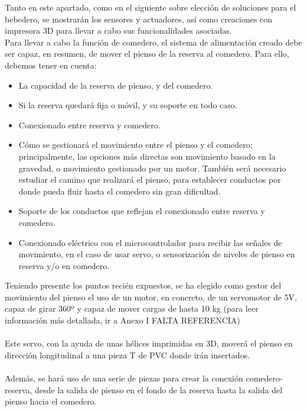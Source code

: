 \documentclass[12pt]{article}
\begin{document}
	\noindent Tanto en este apartado, como en el siguiente sobre elección de soluciones para el bebedero, se mostrarán los sensores y actuadores, así como creaciones con impresora 3D para llevar a cabo sus funcionalidades asociadas.\\
	
	\noindent Para llevar a cabo la función de comedero, el sistema de alimentación creado debe ser capaz, en resumen, de mover el pienso de la reserva al comedero. Para ello, debemos tener en cuenta: 
	
	\begin{itemize}
		\item La capacidad de la reserva de pienso, y del comedero.
		\item Si la reserva quedará fija o móvil, y su soporte en todo caso.
		\item Conexionado entre reserva y comedero.
		\item Cómo se gestionará el movimiento entre el pienso y el comedero; principalmente, las opciones más directas son movimiento basado en la gravedad, o movimiento gestionado por un motor. También será necesario estudiar el camino que realizará el pienso, para establecer conductos por donde pueda fluir hasta el comedero sin gran dificultad.
		\item Soporte de los conductos que reflejan el conexionado entre reserva y comedero.
		\item Conexionado eléctrico con el microcontrolador para recibir las señales de movimiento, en el caso de usar servo, o sensorización de niveles de pienso en reserva y/o en comedero.
	\end{itemize}
	
	\noindent Teniendo presente los puntos recién expuestos, se ha elegido como gestor del movimiento del pienso el uso de un motor, en concreto, de un servomotor de 5V, capaz de girar 360º y capaz de mover cargas de hasta 10 kg (para leer información más detallada, ir a Anexo I FALTA REFERENCIA) \\
	
	 \\
	
	\noindent Este servo, con la ayuda de unas hélices imprimidas en 3D, moverá el pienso en dirección longitudinal a una pieza T de PVC donde irán insertados. \\
	
	\noindent [Foto] \\
	
	\noindent Además, se hará uso de una serie de piezas para crear la conexión comedero-reserva, desde la salida de pienso en el fondo de la reserva hasta la salida del pienso hacia el comedero. \\
	
\end{document}
